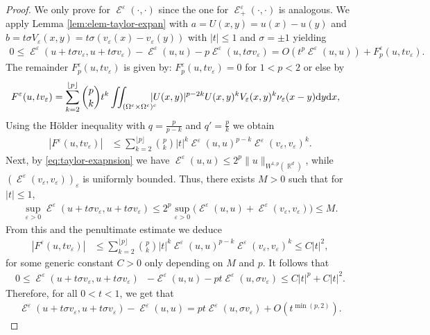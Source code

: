 \documentclass[12pt, reqno]{amsart}%
\theoremstyle{plain}  %
\theoremstyle{definition}  %
\numberwithin{equation}{section}
\DeclareMathOperator{\cE}{\mathcal{E}}
\DeclareMathOperator{\R}{\mathbb{R}}
\newcommand{\iil}{\iint}
\renewcommand{\d}{\mathrm{d}}
\newcommand{\eps}{\varepsilon}
\begin{document}
\begin{proof}
We only prove for $\cE^\eps(\cdot,\cdot)$ since  the one for $\cE^\eps_+(\cdot,\cdot)$  is analogous.  We apply Lemma \ref{lem:elem-taylor-expan} with $a= U(x,y)= u(x)-u(y)$ and $b=t\sigma V_\eps(x,y)= t\sigma (v_\eps(x)-v_\eps(y))$ with $|t|\leq 1$ and $ \sigma =\pm1 $ yielding
\begin{align*}
0\leq \cE^\eps(u+t\sigma v_\eps, u+t\sigma v_\eps)-\cE^\eps(u, u)-p\cE^\eps(u, t\sigma v_\eps)= O( t^{p}\cE^\eps(u , u))+ F^\eps_p (u,tv_\eps).
\end{align*}
The remainder $F^\eps_p (u,tv_\eps)$ is given by: $F^\eps_p (u,tv_\eps)=0$ for $1<p<2$ or else by
\begin{align*}
F^\eps (u,tv_\eps) &=  \sum_{k=2}^{\lfloor p\rfloor}\binom{p}{k} t^k
\iil_{(\Omega^c\times \Omega^c)^c}\hspace{-2ex}
|U(x,y)|^{p-2k} U(x,y)^{k}V_\eps(x,y)^{k}\nu_\eps(x-y)\d y \d x,
\end{align*}
 Using the H\"older inequality with $q= \frac{p}{p-k}$ and $q'= \frac{p}{k}$ we obtain
\begin{align*}
|F^\eps (u,tv_\eps)|
&\leq \sum_{k=2}^{\lfloor p\rfloor}\binom{p}{k}  |t|^k \cE^\eps(u,u)^{p-k} \cE^\eps(v_\eps,v_\eps)^k.
\end{align*}
Next, by \eqref{eq:taylor-exapnsion} we have $\cE^\eps(u,u)\leq 2^p \|u\|_{W^{1,p}(\R^d)}$, while $(\cE^\eps(v_\eps,v_\eps))_\eps$ is uniformly bounded. Thus, there exists $ M > 0$ such that for $|t|\leq 1$,
\begin{align*}
\sup_{\eps>0} \cE^\eps(u+ t\sigma v_\eps,u+ t\sigma v_\eps)\leq 2^p\sup_{\eps>0} \big(\cE^\eps(u,u) + \cE^\eps(v_\eps,v_\eps)\big)\leq M.
\end{align*}
From this and the penultimate estimate we deduce
\begin{align*}
|F^\eps (u,tv_\eps)|
&\leq \sum_{k=2}^{\lfloor p\rfloor}\binom{p}{k}  |t|^k \cE^\eps(u,u)^{p-k} \cE^\eps(v_\eps,v_\eps)^k\leq C|t|^2,
\end{align*}
for some generic constant $C>0$ only depending on $M$ and $p.$ It follows that
\begin{align*}
0\leq \cE^\eps(u+t\sigma v_\eps, u+t\sigma v_\eps)&-\cE^\eps(u, u)-pt\cE^\eps(u, \sigma v_\eps)\leq  C |t|^{p}+ C|t|^2.
\end{align*}
Therefore, for  all $0<t<1$, we get that
\begin{align*}
\cE^\eps(u+t\sigma v_\eps, u+t\sigma v_\eps)-\cE^\eps(u, u)  =   pt\cE^\eps(u, \sigma v_\eps)+ O( t^{\min(p,2)}).
\end{align*}

\end{proof}
\end{document}
